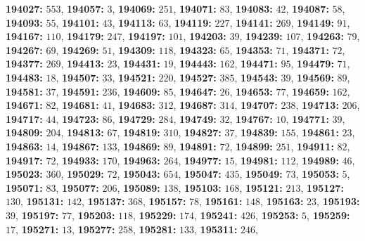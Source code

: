 \textsf{\bfseries 194027:} $553$, \textsf{\bfseries 194057:} $3$, \textsf{\bfseries 194069:} $251$, \textsf{\bfseries 194071:} $83$, \textsf{\bfseries 194083:} $42$, \textsf{\bfseries 194087:} $58$, \textsf{\bfseries 194093:} $55$, \textsf{\bfseries 194101:} $43$, \textsf{\bfseries 194113:} $63$, \textsf{\bfseries 194119:} $227$, \textsf{\bfseries 194141:} $269$, \textsf{\bfseries 194149:} $91$, \textsf{\bfseries 194167:} $110$, \textsf{\bfseries 194179:} $247$, \textsf{\bfseries 194197:} $101$, \textsf{\bfseries 194203:} $39$, \textsf{\bfseries 194239:} $107$, \textsf{\bfseries 194263:} $79$, \textsf{\bfseries 194267:} $69$, \textsf{\bfseries 194269:} $51$, \textsf{\bfseries 194309:} $118$, \textsf{\bfseries 194323:} $65$, \textsf{\bfseries 194353:} $71$, \textsf{\bfseries 194371:} $72$, \textsf{\bfseries 194377:} $269$, \textsf{\bfseries 194413:} $23$, \textsf{\bfseries 194431:} $19$, \textsf{\bfseries 194443:} $162$, \textsf{\bfseries 194471:} $95$, \textsf{\bfseries 194479:} $71$, \textsf{\bfseries 194483:} $18$, \textsf{\bfseries 194507:} $33$, \textsf{\bfseries 194521:} $220$, \textsf{\bfseries 194527:} $385$, \textsf{\bfseries 194543:} $39$, \textsf{\bfseries 194569:} $89$, \textsf{\bfseries 194581:} $37$, \textsf{\bfseries 194591:} $236$, \textsf{\bfseries 194609:} $85$, \textsf{\bfseries 194647:} $26$, \textsf{\bfseries 194653:} $77$, \textsf{\bfseries 194659:} $162$, \textsf{\bfseries 194671:} $82$, \textsf{\bfseries 194681:} $41$, \textsf{\bfseries 194683:} $312$, \textsf{\bfseries 194687:} $314$, \textsf{\bfseries 194707:} $238$, \textsf{\bfseries 194713:} $206$, \textsf{\bfseries 194717:} $44$, \textsf{\bfseries 194723:} $86$, \textsf{\bfseries 194729:} $284$, \textsf{\bfseries 194749:} $32$, \textsf{\bfseries 194767:} $10$, \textsf{\bfseries 194771:} $39$, \textsf{\bfseries 194809:} $204$, \textsf{\bfseries 194813:} $67$, \textsf{\bfseries 194819:} $310$, \textsf{\bfseries 194827:} $37$, \textsf{\bfseries 194839:} $155$, \textsf{\bfseries 194861:} $23$, \textsf{\bfseries 194863:} $14$, \textsf{\bfseries 194867:} $133$, \textsf{\bfseries 194869:} $89$, \textsf{\bfseries 194891:} $72$, \textsf{\bfseries 194899:} $251$, \textsf{\bfseries 194911:} $82$, \textsf{\bfseries 194917:} $72$, \textsf{\bfseries 194933:} $170$, \textsf{\bfseries 194963:} $264$, \textsf{\bfseries 194977:} $15$, \textsf{\bfseries 194981:} $112$, \textsf{\bfseries 194989:} $46$, \textsf{\bfseries 195023:} $360$, \textsf{\bfseries 195029:} $72$, \textsf{\bfseries 195043:} $654$, \textsf{\bfseries 195047:} $435$, \textsf{\bfseries 195049:} $73$, \textsf{\bfseries 195053:} $5$, \textsf{\bfseries 195071:} $83$, \textsf{\bfseries 195077:} $206$, \textsf{\bfseries 195089:} $138$, \textsf{\bfseries 195103:} $168$, \textsf{\bfseries 195121:} $213$, \textsf{\bfseries 195127:} $130$, \textsf{\bfseries 195131:} $142$, \textsf{\bfseries 195137:} $368$, \textsf{\bfseries 195157:} $78$, \textsf{\bfseries 195161:} $148$, \textsf{\bfseries 195163:} $23$, \textsf{\bfseries 195193:} $39$, \textsf{\bfseries 195197:} $77$, \textsf{\bfseries 195203:} $118$, \textsf{\bfseries 195229:} $174$, \textsf{\bfseries 195241:} $426$, \textsf{\bfseries 195253:} $5$, \textsf{\bfseries 195259:} $17$, \textsf{\bfseries 195271:} $13$, \textsf{\bfseries 195277:} $258$, \textsf{\bfseries 195281:} $133$, \textsf{\bfseries 195311:} $246$, 
